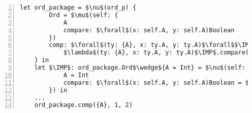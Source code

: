 \begin{figure*}[h]
\begin{lstlisting}[mathescape,numbers=left]
    let ord_package = $\nu$(ord_p) {
        Ord = $\mu$(self: {
            A
            compare: $\forall$(x: self.A, y: self.A)Boolean
        })
        comp: $\forall$(ty: {A}, x: ty.A, y: ty.A)$\forall$$\IMP$(ev: ord_p.Ord$\wedge${A})Boolean =
            $\lambda$(ty: {A}, x: ty.A, y: ty.A)$\IMP$.compare(x, y)
    } in
    let $\IMP$: ord_package.Ord$\wedge${A = Int} = $\nu$(self: {
            A = Int
            compare: $\forall$(x: self.A, y: self.A)Boolean = $\lambda$(x: self.A, y: self.A) x < y
        }) in
    ...
    ord_package.comp({A}, 1, 2)
\end{lstlisting}
\caption*{\textbf{Example 2.} The type class pattern in DIF}
\end{figure*}
